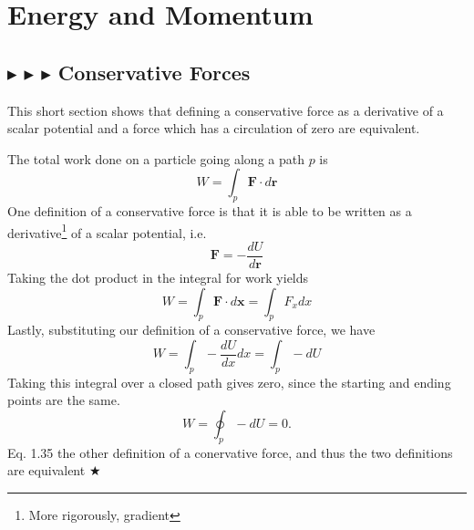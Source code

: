 \clearpage

%
%
%
%

\section{Energy and Momentum}

%
%
\subsection{\color{PineGreen} $\blacktriangleright$ \color{Goldenrod} $\blacktriangleright$ \color{Orchid} $\blacktriangleright$ \color{black} Conservative Forces} \label{1.3.1}
This short section shows that defining a conservative force as a derivative of a scalar potential and a force which has a circulation of zero are equivalent. 

\noindent The total work done on a particle going along a path $p$ is 
\begin{equation}
    W = \int_p \mathbf{F}\cdot d\mathbf{r}
\end{equation}
\noindent One definition of a conservative force is that it is able to be written as a derivative\footnote{More rigorously, gradient} of a scalar potential, i.e.
\begin{equation}
    \mathbf{F} = -\frac{dU}{d\mathbf{r}}
\end{equation}
\noindent Taking the dot product in the integral for work yields
\begin{equation}
    W = \int_p \mathbf{F}\cdot d\mathbf{x} = \int_p F_xdx
\end{equation}
Lastly, substituting our definition of a conservative force, we have 
\begin{equation}
    W = \int_p - \frac{dU}{dx}dx = \int_p -dU
\end{equation}
\noindent Taking this integral over a closed path gives zero, since the starting and ending points are the same.
\begin{equation}
    W=\oint_p -dU = 0.
\end{equation}
Eq. 1.35 the other definition of a conervative force, and thus the two definitions are equivalent $\bigstar$


